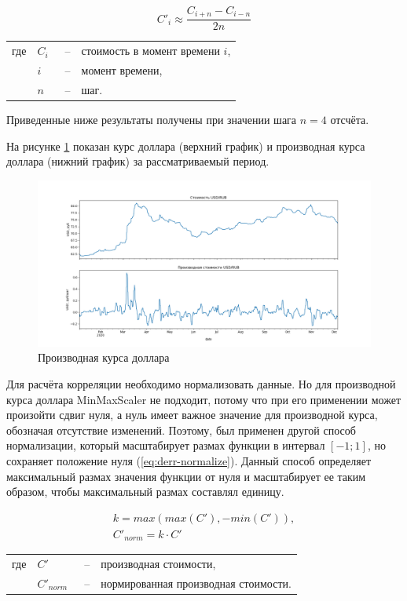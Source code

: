 \begin{equation}
    C'_i \approx \frac{C_{i+n} - C_{i-n}}{2n}
    \label{eq:derrivative}
\end{equation}
\noindent\begin{tabularx}{\linewidth}{lllX}
    где & $C_i$    &~--& стоимость в момент времени $i$, \\
        & $i$      &~--& момент времени, \\
        & $n$      &~--& шаг. \\
\end{tabularx}

Приведенные ниже результаты получены при значении шага $n = 4$ отсчёта.

На рисунке \ref{img:usd_derrivative} показан курс доллара (верхний график) и производная курса доллара (нижний график) за рассматриваемый период.

\begin{figure}[h]
    \centering
    \includegraphics[width=\linewidth]{images/correlations/usd_derrivative.png}
    \caption{Производная курса доллара}
    \label{img:usd_derrivative}
\end{figure}

Для расчёта корреляции необходимо нормализовать данные. Но для производной курса доллара MinMaxScaler не подходит, потому что при его применении может произойти сдвиг нуля, а нуль имеет важное значение для производной курса, обозначая отсутствие изменений. Поэтому, был применен другой способ нормализации, который масштабирует размах функции в интервал $[-1; 1]$, но сохраняет положение нуля (\ref{eq:derr-normalize}). Данный способ определяет максимальный размах значения функции от нуля и масштабирует ее таким образом, чтобы максимальный размах составлял единицу.

\begin{equation}
    \begin{array}{l}
        k = max(max(C'), -min(C')), \\
        C'_{norm} = k \cdot C'
    \end{array}
    \label{eq:derr-normalize}
\end{equation}\noindent\begin{tabularx}{\linewidth}{lllX}
    где & $C'$         &~--& производная стоимости, \\
        & $C'_{norm}$  &~--& нормированная производная стоимости. \\
\end{tabularx}


